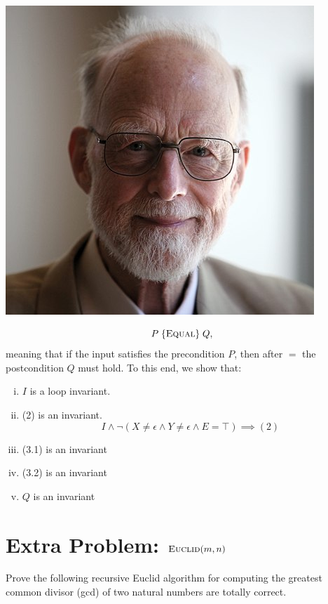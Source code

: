 \documentclass{tufte-handout}
\begin{document}
\begin{CJK*}{UTF8}{gbsn}
\begin{marginfigure}%
  \includegraphics[width=0.60\linewidth]{figs/tony-hoare}
  \label{fig:hoare}
\end{marginfigure}
\[
  P \;\{\textsc{Equal}\}\; Q,
\]
meaning that if the input satisfies the precondition $P$, 
then after $\equal$ the postcondition $Q$ must hold.
To this end, we show that:



\begin{enumerate}[(i)]
  \item $I$ is a loop invariant.
  \item (2) is an invariant.
    \[
      I \land \lnot (X \neq \epsilon \land Y \neq \epsilon \land E = \top) \implies (2)
    \]
  \item (3.1) is an invariant
  \item (3.2) is an invariant
  \item $Q$ is an invariant
\end{enumerate}

\section{Extra Problem: $\textsc{Euclid}(m, n)$}  \label{section:euclid}

Prove the following recursive Euclid algorithm for 
computing the greatest common divisor (gcd) of two natural numbers are totally correct.


\end{CJK*}
\end{document}
